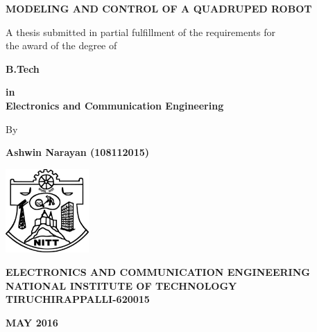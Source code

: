 \begin{titlepage}
\begin{center}
\fontsize{18pt}{1cm}\selectfont \textbf{MODELING AND CONTROL OF A QUADRUPED ROBOT}

\vspace*{1.4cm}
\fontsize{14pt}{21pt}\selectfont A thesis submitted in partial fulfillment of the requirements for\\
the award of the degree of

\vspace*{0.8cm}
\fontsize{14pt}{1cm}\selectfont\textbf{B.Tech} 

\vspace*{0.8cm}
\textbf{in\\Electronics and Communication Engineering}

\vspace*{2.0cm}
By

\textbf{Ashwin Narayan (108112015)}

\vspace*{3.4cm}
\includegraphics[width=1.25in]{NITT-Logo}

\vspace*{0.3cm}
\fontsize{16pt}{16pt}\selectfont \textbf{ELECTRONICS AND COMMUNICATION ENGINEERING\\NATIONAL INSTITUTE OF TECHNOLOGY\\TIRUCHIRAPPALLI-620015}

\vspace*{0.5cm}
\textbf{MAY 2016}
\end{center}
\end{titlepage}
